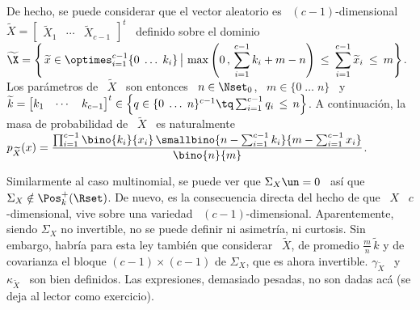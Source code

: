 De hecho, se puede considerar que el vector aleatorio es \ $(c-1)$-dimensional \
$\widetilde{X}     =    \begin{bmatrix}     \widetilde{X}_1    &     \cdots    &
  \widetilde{X}_{c-1}   \end{bmatrix}^t$   \  definido   sobre   el  dominio   \
$\displaystyle    \widetilde{\X}   =    \left\{    \left.   \widetilde{x}    \in
    \optimes_{i=1}^{c-1} \{ 0 \; \ldots \; k_i\} \, \right| \, \max\left( 0 \, ,
    \,  \sum_{i=1}^{c-1}  k_i  +  m  -  n \right)  \:  \le  \:  \sum_{i=1}^{c-1}
  \widetilde{x}_i \: \le \: m \right\}$. Los par\'ametros de \ $\widetilde{X}$ \
son  entonces \  $n \in  \Nset_0$, \  $m \in  \{  0 \;  \ldots \;  n \}$  \ y  \
$\widetilde{k}     =     \protect\begin{bmatrix}      k_1     &     \cdots     &
  k_{c-1} \end{bmatrix}^t\protect \in \left\{ q \in \{ 0 \; \ldots \; n \}^{c-1}
  \tq \sum_{i=1}^{c-1} q_i  \, \le \, n \right\}$. A  continuaci\'on, la masa de
probabilidad   de  \   $\widetilde{X}$  \   es  naturalmente   \  $\displaystyle
p_{\widetilde{X}}(x)  =  \frac{\prod_{i=1}^{c-1} \bino{k_i\vspace{1mm}}{x_i}  \,
  \smallbino{n   -   \sum_{i=1}^{c-1}   k_i\vspace{2mm}}{m  -   \sum_{i=1}^{c-1}
    x_i}}{\bino{n}{m}}$.

Similarmente al  caso multinomial, se puede ver  que $\Sigma_X \un =  0$ \ as\'i
que \ $\Sigma_X \notin \Pos_k^+(\Rset)$.  De nuevo, es la consecuencia directa del
hecho   de  que   \  $X$   \  $c$-dimensional,   vive  sobre   una   variedad  \
$(c-1)$-dimensional. Aparentemente, siendo $\Sigma_X$ no invertible, no se puede
definir  ni  asimetr\'ia, ni  curtosis.  Sin  embargo,  habr\'ia para  esta  ley
tambi\'en  que  considerar  \   $\widetilde{X}$,  de  promedio  $\frac{m}{n}  \,
\widetilde{k}$ y de covarianza el bloque $(c-1) \times (c-1)$ de $\Sigma_X$, que
es ahora  invertible. $\gamma_{\widetilde{X}}$ \ y  \ $\kappa_{\widetilde{X}}$ \
son bien definidos.  Las expresiones, demasiado pesadas, no  son dadas ac\'a (se
deja al lector como exercicio).


\SZ{Ver si se calcula Phi}

